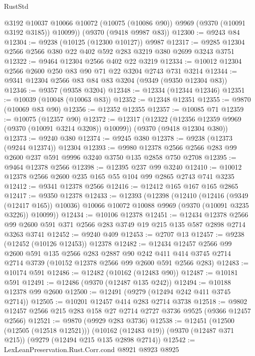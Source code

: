\begin{lexlean}{RustStd}
\begin{coremodule}
{\begin{coremodule}
{{{{{{{{{{{{{{{{{{{{{{{{{{{{{{{{{{{{{{{        @3192
        @10037
        @10066
        @10072
        (@10075 (@10086 @90))
        @9969
        (@9370 (@10091 @3192 @3185))
        @10099))
    (@9370 (@9418 @9987 @83))
@12300 := @9243 @84
@12304 := @9238 (@10125 (@12300 @10127)) @9987
@12317 := @9285 @12304 @2566 @2566 @380 @22 @402 @592 @283 @3219 @380 @2699 @3243 @3751
@12322 := @9464 @12304 @2566 @402 @22 @3219
@12334 := @10012 @12304 @2566 @2600 @250 @83 @90 @71 @22 @3204 @2743 @731 @3214
@12344 := @9341 @12304 @2566 @83 @84 @83 @3204 (@9349 (@9350 @12304 @83))
@12346 := @9357 (@9358 @3204)
@12348 := @12334 (@12344 @12346)
@12351 := @10039 (@10048 (@10063 @83))
@12352 := @12348 @12351
@12355 := @9870 (@10069 @83 @90)
@12356 := @12352 @12355
@12357 := @10085 @71
@12359 := @10075 (@12357 @90)
@12372 := @12317
    (@12322 (@12356 @12359 @9969 (@9370 (@10091 @3214 @3208)) @10099))
    (@9370 (@9418 @12304 @380))
@12373 := @9240 @380
@12374 := @9245 @380
@12378 := @9238 (@12373 (@9244 @12374)) @12304
@12393 := @9980 @12378 @2566 @2566 @283 @99 @2600 @237 @591 @9996 @3240 @3750 @135 @2858 @750 @2708
@12395 := @9464 @12378 @2566
@12398 := @12395 @237 @99 @3240
@12410 := @10012 @12378 @2566 @2600 @235 @165 @55 @104 @99 @2865 @2743 @741 @3235
@12412 := @9341 @12378 @2566
@12416 := @12412 @165 @167 @165 @2865
@12417 := @9350 @12378
@12433 := @12393
    (@12398
      (@12410
        (@12416 (@9349 (@12417 @165)) @10036)
        @10066
        @10072
        @10088
        @9969
        (@9370 (@10091 @3235 @3226))
        @10099))
@12434 := @10106 @12378
@12451 := @12434
    @12378
    @2566
    @99
    @2600
    @591
    @371
    @2566
    @283
    @3749
    @19
    @215
    @135
    @587
    @2898
    @2714
    @3263
    @3741
@12452 := @9240 @409
@12453 := @2707 @13
@12457 := @9238 (@12452 (@10126 @12453)) @12378
@12482 := @12434
    @12457
    @2566
    @99
    @2600
    @591
    @135
    @2566
    @283
    @2887
    @90
    @242
    @411
    @414
    @3745
    @2714
    @2714
    @3739
    (@10152 @12378 @2566 @99 @2600 @591 @2566 @283)
@12483 := @10174 @591
@12486 := @12482 (@10162 (@12483 @90))
@12487 := @10181 @591
@12491 := @12486 (@9370 (@12487 @135 @242))
@12494 := @10188 @12378 @99 @2600
@12500 := @12491 (@9279 (@12494 @242 @411 @3745 @2714))
@12505 := @10201 @12457 @414 @283 @2714 @3738
@12518 := @9802 @12457 @2566 @215 @283 @158 @27 @2714 @2727 @3736 @9525 (@9366 @12457 @2566)
@12521 := @9870 (@9929 @283 @3736)
@12538 := @12451
    (@12500 (@12505 (@12518 @12521)))
    (@10162 (@12483 @19))
    (@9370 (@12487 @371 @215))
    (@9279 (@12494 @215 @135 @2898 @2714))
@12542 := LexLeanPreservation.Rust.Corr.cond @8921 @8923 @8925
}}}}}}}}}}}}}}}}}}}}}}}}}}}}}}}}}}}}}}}
\end{coremodule}}
\end{coremodule}
\end{lexlean}
